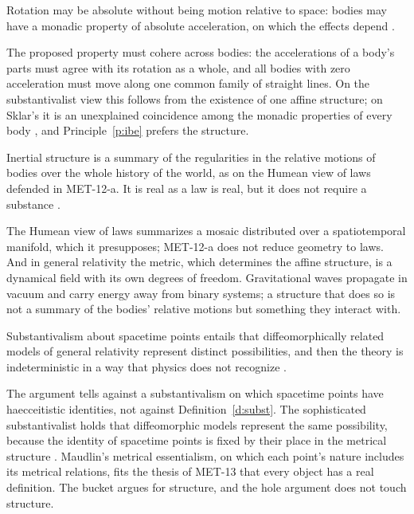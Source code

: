 \documentclass{situationist-preprint}
\begin{document}
\begin{objection}\label{o:sklar}
Rotation may be absolute without being motion relative to space: bodies may have a monadic property of absolute acceleration, on which the effects depend \citep{Sklar1974}.
\end{objection}

\begin{reply}
The proposed property must cohere across bodies: the accelerations of a body's parts must agree with its rotation as a whole, and all bodies with zero acceleration must move along one common family of straight lines. On the substantivalist view this follows from the existence of one affine structure; on Sklar's it is an unexplained coincidence among the monadic properties of every body \citep{Earman1989}, and Principle~\ref{p:ibe} prefers the structure.
\end{reply}

\begin{objection}\label{o:huggett}
Inertial structure is a summary of the regularities in the relative motions of bodies over the whole history of the world, as on the Humean view of laws defended in MET-12-a. It is real as a law is real, but it does not require a substance \citep{Huggett2006}.
\end{objection}

\begin{reply}
The Humean view of laws summarizes a mosaic distributed over a spatiotemporal manifold, which it presupposes; MET-12-a does not reduce geometry to laws. And in general relativity the metric, which determines the affine structure, is a dynamical field with its own degrees of freedom. Gravitational waves propagate in vacuum and carry energy away from binary systems; a structure that does so is not a summary of the bodies' relative motions but something they interact with.
\end{reply}

\begin{objection}\label{o:hole}
Substantivalism about spacetime points entails that diffeomorphically related models of general relativity represent distinct possibilities, and then the theory is indeterministic in a way that physics does not recognize \citep{EarmanNorton1987}.
\end{objection}

\begin{reply}
The argument tells against a substantivalism on which spacetime points have haecceitistic identities, not against Definition~\ref{d:subst}. The sophisticated substantivalist holds that diffeomorphic models represent the same possibility, because the identity of spacetime points is fixed by their place in the metrical structure \citep{Butterfield1989,Maudlin1988}. Maudlin's metrical essentialism, on which each point's nature includes its metrical relations, fits the thesis of MET-13 that every object has a real definition. The bucket argues for structure, and the hole argument does not touch structure.
\end{reply}
\end{document}
